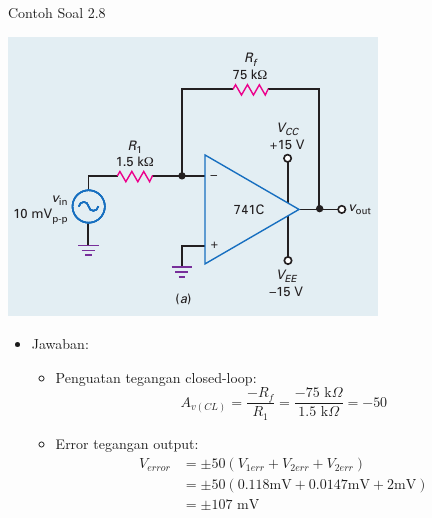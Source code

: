 \begin{frame}[t]{Contoh Soal 2.8}
	\begin{multicols}{2}
		\begin{center}
			\includegraphics[width=\linewidth]{gambar/fig-16.17a}
		\end{center}
		\columnbreak
		\begin{itemize}
			\item Jawaban:
			\begin{itemize}
				\item Penguatan tegangan closed-loop:
				\[ A_{v(CL)} = \frac{-R_f}{R_1} = \frac{-75 \text{ k}\Omega}{1.5 \text{ k}\Omega} = -50\]
				\item Error tegangan output:
				\begin{align*}
					V_{error} &= \pm 50 (V_{1err} + V_{2err} + V_{2err}) \\
					&= \pm 50 (0.118 \text{mV} + 0.0147 \text{mV} + 2 \text{mV}) \\
					&= \pm 107 \text{ mV}
				\end{align*}
			\end{itemize}
		\end{itemize}
	\end{multicols}
\end{frame}

